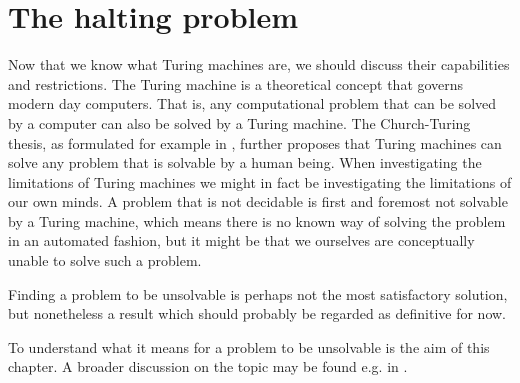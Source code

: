 \section{The halting problem}

Now that we know what Turing machines are, we should discuss their capabilities and restrictions.
The Turing machine is a theoretical concept that governs modern day computers. That is, any computational problem that can be solved by a computer can also be solved by a Turing machine.
The Church-Turing thesis, as formulated for example in \cite{tur36}, further proposes that Turing machines can solve any problem that is solvable by a human being.
When investigating the limitations of Turing machines we might in fact be investigating the limitations of our own minds.
A problem that is not decidable is first and foremost not solvable by a Turing machine, which means there is no known way of solving the problem in an automated fashion, but it might be that we ourselves are conceptually unable to solve such a problem.

Finding a problem to be unsolvable is perhaps not the most satisfactory solution, but nonetheless a result which should probably be regarded as definitive for now.

To understand what it means for a problem to be unsolvable is the aim of this chapter.
A broader discussion on the topic may be found e.g. in \cite{sip06}.







